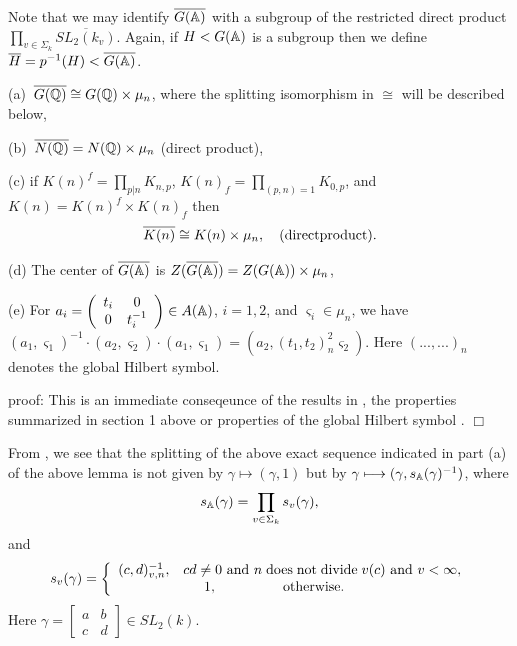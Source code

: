 Note that we may identify $\overline{G({\Bbb{A}})}$ with a subgroup of the
restricted direct product
$\prod_{v\in \Sigma _k}\overline{SL_2(k_v)}$. Again,
if $H<G({\Bbb{A}})$ is a subgroup then we define
$\overline{H}=p^{-1}(H)<\overline{G({\Bbb{A}})}$.

\begin{lemma}
(a)\ $\overline{G({\Bbb{Q}})}\cong G({\Bbb{Q}})\times \mu _n$,
where the splitting isomorphism in $\cong$ will be
described below,

(b)\ $\overline{N({\Bbb{Q}})}=N({\Bbb{Q}})\times \mu _n$ (direct product),

(c) if $K(n)^f=\prod_{p|n}K_{n,p}$, $K(n)_f=\prod_{(p,n)=1}K_{0,p}$, and
$K(n)=K(n)^f\times K(n)_f$ then 
\[
\overline{K(n)}\cong K(n)\times \mu _n,
\ \ \ {\rm (direct product)}.
\]

(d) The center of $\overline{G({\Bbb{A}})}$ is
$Z(\overline{G({\Bbb{A}})})=Z(G({{\Bbb{A}}}))\times \mu _n$,

(e) For $a_i=\left( 
\begin{array}{cc}
t_i & 0 \\ 
0 & t_i^{-1}
\end{array}
\right) \in A({\Bbb{A}})$, $i=1,2$, and $\varsigma _i\in \mu _n$, we have $%
(a_1,\varsigma _1)^{-1}\cdot (a_2,\varsigma _2)\cdot (a_1,\varsigma
_1)=(a_2,(t_1,t_2)_n^2\varsigma _2)$. Here $(...,...)_n$ denotes the global
Hilbert symbol.
\end{lemma}

proof: This is an immediate conseqeunce of the results in
\cite{K2}, the properties summarized in section 1 above
or properties of the global Hilbert symbol \cite{W1}. $\Box $

From \cite{K2}, we see that
the splitting of the above exact sequence indicated in part (a) of the above
lemma is not given by $\gamma \longmapsto (\gamma ,1)$ but by $\gamma
\longmapsto (\gamma ,s_{{\Bbb{A}}}(\gamma )^{-1})$, where 
\[
s_{{\Bbb{A}}}(\gamma )=
\prod_{v\in \Sigma _k}
s_v(\gamma),
\]
and
\begin{equation}
s_v(\gamma)=\left\{ 
\begin{array}{c}
(c,d)_{v,n}^{-1},
\;\;\;cd\neq 0{\rm \ and\ }
n\;\mathrm{does\;not\;divide}\;v(c)
{\rm \ and\ }v<\infty, \\ 
1,\;\;\;\;\;\;\;\;\;\;\;\;\;\;\;\;
\mathrm{\;otherwise}.\;\;\;\;\;\;\;\;
\end{array}
\right.
\end{equation}
Here $\gamma =\left[ 
\begin{array}{cc}
a & b \\ 
c & d
\end{array}
\right] \in SL_2(k)$.

